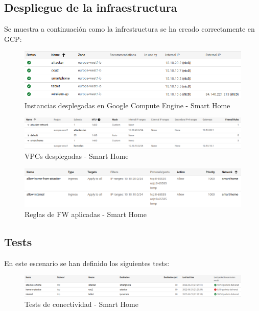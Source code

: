 \subsection{Despliegue de la infraestructura}
  Se muestra a continuación como la infrestructura se ha creado correctamente en GCP:

  \begin{figure}[h]
  \centering
  \includegraphics[width=\textwidth]{../imgs/desarrollo/resultados/sh/instances.png}
  \caption{Instancias desplegadas en Google Compute Engine - Smart Home}
  \end{figure}

  \begin{figure}[h]
  \centering
  \includegraphics[width=\textwidth]{../imgs/desarrollo/resultados/sh/vpcs.png}
  \caption{VPCs desplegadas - Smart Home}
  \end{figure}
  \clearpage

  \begin{figure}[h]
  \centering
  \includegraphics[width=\textwidth]{../imgs/desarrollo/resultados/sh/fws.png}
  \caption{Reglas de FW aplicadas - Smart Home}
  \end{figure}

\subsection{Tests}
  En este escenario se han definido los siguientes tests:

  \begin{figure}[h]
  \centering
  \includegraphics[width=\textwidth]{../imgs/desarrollo/resultados/sh/tests.png}
  \caption{Tests de conectividad - Smart Home}
  \end{figure}

